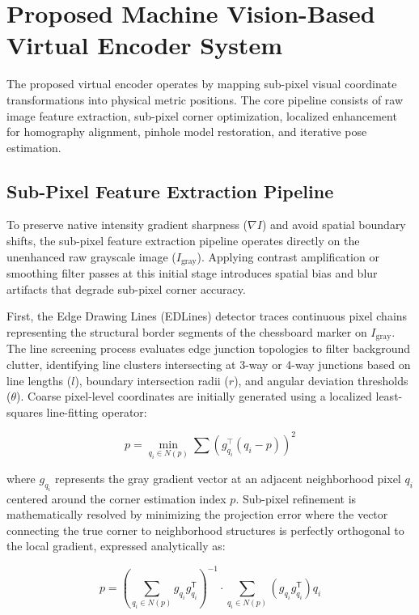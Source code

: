 \section{Proposed Machine Vision-Based Virtual Encoder System}
\label{proposed_encoder}
The proposed virtual encoder operates by mapping sub-pixel visual coordinate transformations into physical metric positions. The core pipeline consists of raw image feature extraction, sub-pixel corner optimization, localized enhancement for homography alignment, pinhole model restoration, and iterative pose estimation.

\subsection{Sub-Pixel Feature Extraction Pipeline}
To preserve native intensity gradient sharpness ($\nabla I$) and avoid spatial boundary shifts, the sub-pixel feature extraction pipeline operates directly on the unenhanced raw grayscale image ($I_{\text{gray}}$). Applying contrast amplification or smoothing filter passes at this initial stage introduces spatial bias and blur artifacts that degrade sub-pixel corner accuracy.

First, the Edge Drawing Lines (EDLines) detector traces continuous pixel chains representing the structural border segments of the chessboard marker on $I_{\text{gray}}$. The line screening process evaluates edge junction topologies to filter background clutter, identifying line clusters intersecting at 3-way or 4-way junctions based on line lengths ($l$), boundary intersection radii ($r$), and angular deviation thresholds ($\theta$). Coarse pixel-level coordinates are initially generated using a localized least-squares line-fitting operator:

\begin{equation}
p = \min_{q_i \in N(p)} \sum \left( g_{q_i}^{\top} (q_i - p) \right)^2
\end{equation}

where $g_{q_i}$ represents the gray gradient vector at an adjacent neighborhood pixel $q_i$ centered around the corner estimation index $p$. Sub-pixel refinement is mathematically resolved by minimizing the projection error where the vector connecting the true corner to neighborhood structures is perfectly orthogonal to the local gradient, expressed analytically as:

\begin{equation}
p = \left(\sum_{q_i \in N(p)} g_{q_i} g_{q_i}^{\mathsf{T}}\right)^{-1} \cdot \sum_{q_i \in N(p)} \left(g_{q_i} g_{q_i}^{\mathsf{T}}\right) q_i
\end{equation}

